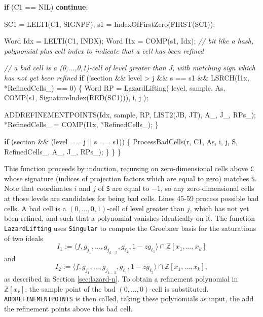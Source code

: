 \documentclass[
]{book}
\newenvironment{Shaded}{\begin{snugshade}}{\end{snugshade}}
\newcommand{\CommentTok}[1]{\textcolor[rgb]{0.56,0.35,0.01}{\textit{#1}}}
\newcommand{\ControlFlowTok}[1]{\textcolor[rgb]{0.13,0.29,0.53}{\textbf{#1}}}
\newcommand{\DecValTok}[1]{\textcolor[rgb]{0.00,0.00,0.81}{#1}}
\newcommand{\NormalTok}[1]{#1}
\theoremstyle{definition}
\theoremstyle{definition}
\theoremstyle{definition}
\theoremstyle{definition}
\theoremstyle{remark}
\begin{document}
\begin{Shaded}
\begin{Highlighting}[numbers=left,,]
        \ControlFlowTok{if}\NormalTok{ (C1 == NIL) }\ControlFlowTok{continue}\NormalTok{;}

\NormalTok{        SC1 = LELTI(C1, SIGNPF);}
\NormalTok{        s1 = IndexOfFirstZero(FIRST(SC1));}

\NormalTok{        Word Idx = LELTI(C1, INDX);}
\NormalTok{        Word I1x = COMP(s1, Idx); }\CommentTok{// bit like a hash, polynomial plus cell index to indicate that a cell has been refined}

        \CommentTok{// a bad cell is a (0,...,0,1){-}cell of level greater than J, with matching sign which has not yet been refined}
        \ControlFlowTok{if}\NormalTok{ (!section \&\& level \textgreater{} j \&\& s == s1 \&\& LSRCH(I1x, *RefinedCells\_) == }\DecValTok{0}\NormalTok{) \{}
\NormalTok{            Word RP = LazardLifting(}
\NormalTok{                level,}
\NormalTok{                sample,}
\NormalTok{                As,}
\NormalTok{                COMP(s1, SignatureIndex(RED(SC1))),}
\NormalTok{                i,}
\NormalTok{                j}
\NormalTok{            );}

\NormalTok{            ADDREFINEMENTPOINTS(Idx, sample, RP, LIST2(JB, JT), A\_, J\_, RPs\_);}
\NormalTok{            *RefinedCells\_ = COMP(I1x, *RefinedCells\_);}
\NormalTok{        \}}

        \ControlFlowTok{if}\NormalTok{ (section \&\& (level == j || s == s1)) \{}
\NormalTok{            ProcessBadCells(r, C1, As, i, j, S, RefinedCells\_, A\_, J\_, RPs\_);}
\NormalTok{        \}}
\NormalTok{    \}}
\NormalTok{\}}
\end{Highlighting}
\end{Shaded}

This function proceeds by induction, recursing on zero-dimensional cells above \texttt{C} whose signature (indices of projection factors which are equal to zero) matches \texttt{S}. Note that coordinates \(i\) and \(j\) of \texttt{S} are equal to \(-1\), so any zero-dimensional cells at those levels are candidates for being bad cells. Lines 45-59 process possible bad cells. A bad cell is a \((0,...,0,1)\)-cell of level greater than \(j\), which has not yet been refined, and such that a polynomial vanishes identically on it.
The function \texttt{LazardLifting} uses \texttt{Singular} to compute the Groebner basis for the saturations of two ideals
\[
I_1 := \langle f, g_{j_1}, \ldots, g_{j_{k-3}}, g_{\ell_2}, 1 - z g_{\ell_1} \rangle \cap \mathbb{Z}[x_1,\ldots,x_k]
\]
and
\[
I_2 := \langle f, g_{j_1}, \ldots, g_{j_{k-3}}, g_{\ell_1}, 1 - z g_{\ell_2} \rangle \cap \mathbb{Z}[x_1,\ldots,x_k],
\]
as described in Section \ref{sec:lazard-n}. To obtain a refinement polynomial in \(\mathbb{Z}[x_r]\), the sample point of the bad \((0,\ldots,0)\)-cell is substituted.
\texttt{ADDREFINEMENTPOINTS} is then called, taking these polynomials as input, the add the refinement points above this bad cell.
\end{document}
